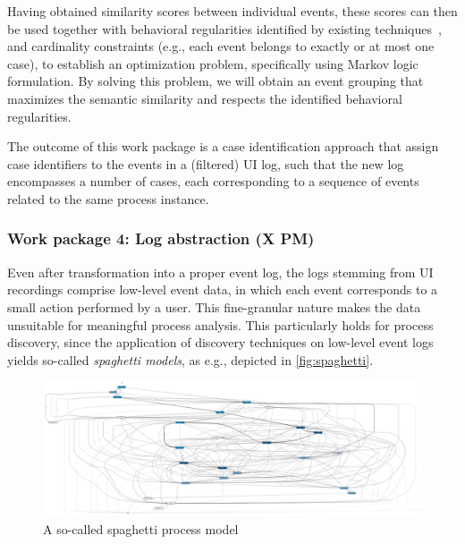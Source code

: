  Having obtained similarity scores between individual events, these scores can then be used together with behavioral regularities identified by existing techniques~\cite{ref}, and cardinality constraints (e.g., each event belongs to exactly or at most one case), to establish an optimization problem, specifically using Markov logic formulation. By solving this problem, we will obtain an event grouping that maximizes the semantic similarity and respects the identified behavioral regularities.

The outcome of this work package is a case identification approach that assign case identifiers to the events in a (filtered) UI log, such that the new log encompasses a number of cases, each corresponding to a sequence of events related to the same process instance.


\subsubsection{Work package 4: Log abstraction (X PM)}
\label{sec:wp4}

Even after transformation into a proper event log, the logs stemming from UI recordings comprise low-level event data, in which each event corresponds to a small action performed by a user. This fine-granular nature makes the data unsuitable for meaningful process analysis. This particularly holds for process discovery, since the application of discovery techniques on low-level event logs yields so-called \emph{spaghetti models}, as e.g., depicted in \autoref{fig:spaghetti}.

\begin{figure} 
	\vspace{-20pt}
	\begin{center}
		\includegraphics[width=\linewidth]{figures/spaghettiprocess.png}
		\caption{A so-called spaghetti process model}
		\label{fig:spaghetti}
	\end{center}
	\vspace{-20pt}
	\vspace{1pt}
\end{figure} 

